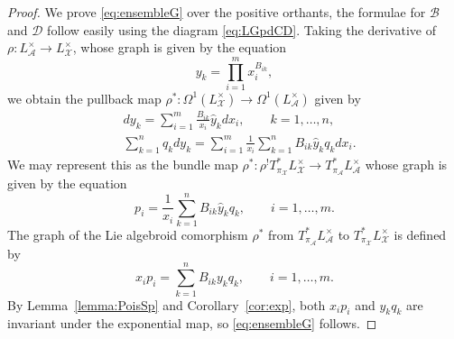 \documentclass{amsart}
\numberwithin{equation}{section}
\newcommand{\cA}{\mathcal{A}}
\newcommand{\cB}{\mathcal{B}}
\newcommand{\cD}{\mathcal{D}}
\newcommand{\cX}{\mathcal{X}}
\begin{document}
\begin{proof}
  We prove \eqref{eq:ensembleG} over the positive orthants, the formulae for $\cB$ and $\cD$ follow easily using the diagram \eqref{eq:LGpdCD}.
  Taking the derivative of $\rho:L^\times_\cA\to L^\times_\cX$, whose graph is given by the equation
  \[y_k = \prod_{i=1}^m x_i^{B_{ik}},\]
  we obtain the pullback map $\rho^*: \Omega^1(L^\times_\cX) \to \Omega^1(L^\times_\cA)$ given by
  \begin{align*}
    & dy_k = \sum_{i=1}^m \frac{B_{ik}}{x_i} \hat{y}_k dx_i, \qquad k = 1, \ldots, n, \\
    & \sum_{k=1}^n q_k dy_k = \sum_{i=1}^m \frac{1}{x_i} \sum_{k=1}^n B_{ik} \hat{y}_k q_k dx_i.
  \end{align*}
  We may represent this as the bundle map $\rho^*:\rho^! T^*_{\pi_\cX} L^\times_\cX \to T^*_{\pi_\cA} L^\times_\cA$ whose graph is given by the equation
  \[p_i = \frac{1}{x_i} \sum_{k=1}^n B_{ik} \hat{y}_k q_k, \qquad i = 1, \ldots, m.\]
  The graph of the Lie algebroid comorphism $\rho^*$ from $T^*_{\pi_\cA} L^\times_\cA$ to $T^*_{\pi_\cX} L^\times_\cX$ is defined by
  \[x_i p_i =  \sum_{k=1}^n B_{ik} y_k q_k, \qquad i = 1, \ldots, m.\]
  By Lemma~\ref{lemma:PoisSp} and Corollary~\ref{cor:exp}, both $x_i p_i$ and $y_k q_k$ are invariant under the exponential map, so \eqref{eq:ensembleG} follows.
\end{proof}
\end{document}
